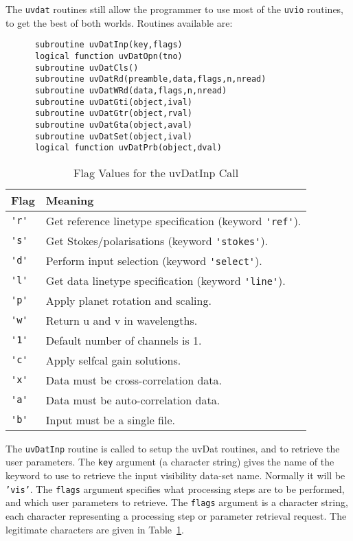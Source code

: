 The {\tt uvdat} routines still allow the programmer to use most of the {\tt uvio}
routines, to get the best of both worlds.
Routines available are:
\begin{verbatim}
      subroutine uvDatInp(key,flags)
      logical function uvDatOpn(tno)
      subroutine uvDatCls()
      subroutine uvDatRd(preamble,data,flags,n,nread)
      subroutine uvDatWRd(data,flags,n,nread)
      subroutine uvDatGti(object,ival)
      subroutine uvDatGtr(object,rval)
      subroutine uvDatGta(object,aval)
      subroutine uvDatSet(object,ival)
      logical function uvDatPrb(object,dval)
\end{verbatim}

\begin{table}\centering
\begin{tabular}{|l|l|} \hline
\bf Flag	& \bf Meaning \\ \hline
\verb+'r'+	& Get reference linetype specification (keyword \verb+'ref'+). \\
\verb+'s'+	& Get Stokes/polarisations (keyword \verb+'stokes'+). \\
\verb+'d'+	& Perform input selection (keyword \verb+'select'+). \\
\verb+'l'+	& Get data linetype specification (keyword \verb+'line'+). \\
\verb+'p'+	& Apply planet rotation and scaling. \\
\verb+'w'+	& Return u and v in wavelengths. \\
\verb+'1'+	& Default number of channels is 1.\\
\verb+'c'+	& Apply selfcal gain solutions.\\
\verb+'x'+	& Data must be cross-correlation data.\\
\verb+'a'+	& Data must be auto-correlation data.\\
\verb+'b'+	& Input must be a single file.\\ \hline
\end{tabular}
\caption{Flag Values for the uvDatInp Call}
\label{t:uvdatinp}
\end{table}

The {\tt uvDatInp} routine is called to setup the uvDat routines, and to
retrieve the user parameters. The {\tt key} argument (a character string)
gives the name of the keyword to use to retrieve the input visibility
data-set name. Normally it will be {\tt 'vis'}. The {\tt flags} argument
specifies what processing steps are to be
performed, and which user parameters to retrieve. The {\tt flags} argument is a
character string, each character representing a processing step or parameter
retrieval request. The legitimate characters are given in
Table~\ref{t:uvdatinp}.

